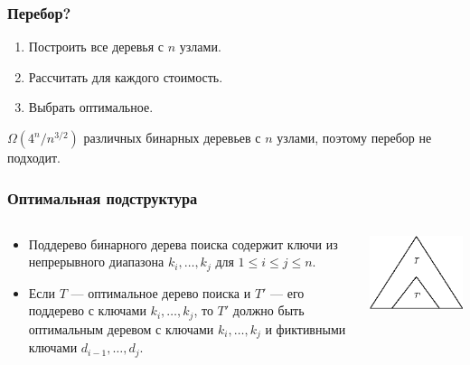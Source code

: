 \documentclass[hyperref={unicode=true}]{beamer}
\begin{document}
\begin{frame}
  \frametitle{Перебор?}
  \begin{enumerate}
  \item Построить все деревья с $n$ узлами. 
  \item Рассчитать для каждого стоимость. 
  \item Выбрать оптимальное. 
  \end{enumerate}
  $\Omega(4^n/n^{3/2})$ различных бинарных деревьев с $n$
  узлами, поэтому перебор не подходит. 
\end{frame}

\begin{frame}
  \frametitle{Оптимальная подструктура}
  \begin{columns}
    \begin{column}{.6\textwidth}
      \begin{itemize}
        \item Поддерево бинарного дерева поиска содержит ключи из
          непрерывного диапазона $k_i, \ldots, k_j$ для $1 \leq i \leq
          j \leq n$.
        \item Если $T$ --- оптимальное дерево поиска и $T'$ --- его
          поддерево с ключами $k_i, \ldots, k_j$, то $T'$ должно быть
          оптимальным деревом с ключами $k_i,\ldots, k_j$ и фиктивными
          ключами $d_{i-1},\ldots, d_j$.
      \end{itemize}
    \end{column}
    \begin{column}{.4\textwidth}
      \includegraphics{bst-opt-subtree.eps}
    \end{column}
  \end{columns}
\end{frame}
\end{document}

